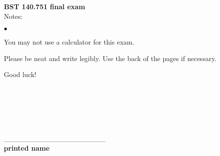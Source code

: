 \documentclass[12pt]{article}
\begin{document}
\noindent
{\bf BST 140.751 final exam} \\
Notes:
\begin{list}{$\bullet$}{}
\item You may not use a calculator for this exam.
\item Please be neat and write legibly. Use the back of the pages if necessary.
\item Good luck!
\end{list}
\ \\ \ \\ \ \\ \ \\ \ \\
 \_\_\_\_\_\_\_\_\_\_\_\_\_\_\_\_\_\_\_\_ \\
{\bf printed name}

\newpage
\end{document}
